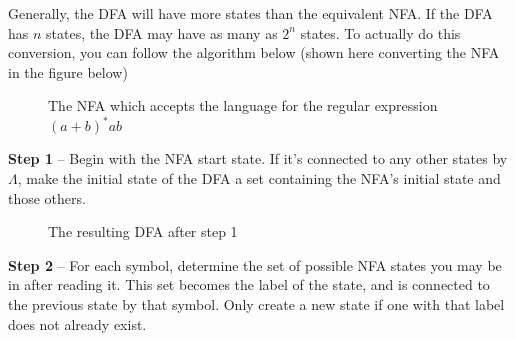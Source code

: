 Generally, the DFA will have more states than the equivalent NFA. If the DFA has $n$ states, the DFA may have as many
 as $2^n$ states. To actually do this conversion, you can follow the algorithm below (shown here converting the NFA in
 the figure below)

\begin{figure}[H]
  \centering
  \caption{The NFA which accepts the language for the regular expression ${(a + b)}^*ab$}
\end{figure}

\textbf{Step 1} -- Begin with the NFA start state. If it's connected to any other states by $\Lambda$, make the initial
 state of the DFA a set containing the NFA's initial state and those others.

\begin{figure}[H]
  \centering
  \caption{The resulting DFA after step 1}
\end{figure}

\textbf{Step 2} -- For each symbol, determine the set of possible NFA states you may be in after reading it. This set
 becomes the label of the state, and is connected to the previous state by that symbol. Only create a new state if one
 with that label does not already exist.

